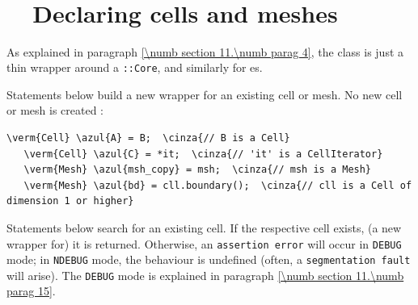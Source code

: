 \section{~~\cinza{[empty]}}\label{\numb section 9.\numb parag 9}


\section{~~Declaring cells and meshes}\label{\numb section 9.\numb parag 10}

As explained in paragraph \ref{\numb section 11.\numb parag 4}, the {\small\tt {}} class
is just a thin wrapper around a {\small\tt {}::Core}, and similarly for {\small\tt {}}es.

Statements below build a new wrapper for an existing cell or mesh.
No new cell or mesh is created :

\begin{Verbatim}[commandchars=\\\{\},formatcom=\small\tt,
   baselinestretch=0.94,framesep=2mm                      ]
   \verm{Cell} \azul{A} = B;  \cinza{// B is a Cell}
   \verm{Cell} \azul{C} = *it;  \cinza{// 'it' is a CellIterator}
   \verm{Mesh} \azul{msh_copy} = msh;  \cinza{// msh is a Mesh}
   \verm{Mesh} \azul{bd} = cll.boundary();  \cinza{// cll is a Cell of dimension 1 or higher}
\end{Verbatim}

Statements below search for an existing cell.
If the respective cell exists, (a new wrapper for) it is returned.
Otherwise, an {\small\tt assertion error} will occur in {\small\tt DEBUG} mode;
in {\small\tt NDEBUG} mode, the behaviour is undefined (often, a {\small\tt segmentation fault}
will arise).
The {\small\tt DEBUG} mode is explained in paragraph \ref{\numb section 11.\numb parag 15}.

